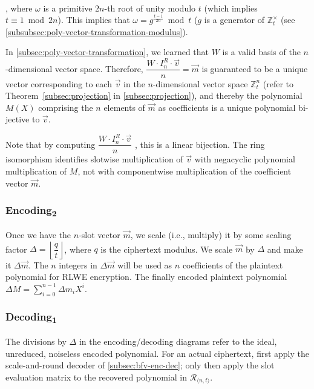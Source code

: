 $ $

, where $\omega$ is a primitive $2n$-th root of unity modulo $t$ (which implies $t \equiv 1 \bmod 2n$). This implies that $\omega = g^{\frac{t - 1}{2n}} \bmod t$ ($g$ is a generator of $\mathbb{Z}_t^{\times}$ (see \autoref{subsubsec:poly-vector-transformation-modulus}).

In \autoref{subsec:poly-vector-transformation}, we learned that $W$ is a valid basis of the $n$-dimensional vector space. Therefore, $\dfrac{W \cdot I_n^R\cdot\vec{v}}{n} = \vec{m}$ is guaranteed to be a unique vector corresponding to each $\vec{v}$ in the $n$-dimensional vector space $\mathbb{Z}_t^{n}$ (refer to Theorem~\ref*{subsec:projection} in \autoref{subsec:projection}), and thereby the polynomial $M(X)$ comprising the $n$ elements of $\vec{m}$ as coefficients is a unique polynomial bi-jective to $\vec{v}$.

Note that by computing $\dfrac{W \cdot I_n^R \cdot \vec{v}}{n}$
, this is a linear bijection. The ring isomorphism identifies slotwise multiplication of $\vec v$ with negacyclic polynomial multiplication of $M$, not with componentwise multiplication of the coefficient vector $\vec m$.

\subsubsection{\textsf{Encoding\textsubscript{2}}}  

Once we have the $n$-slot vector $\vec{m}$, we scale (i.e., multiply) it by some scaling factor $\Delta = \left\lfloor \dfrac{q}{t} \right\rfloor$, where $q$ is the ciphertext modulus. We scale $\vec{m}$ by $\Delta$ and make it $\Delta \vec{m}$. 
The $n$ integers in $\Delta\vec{m}$ will be used as $n$ coefficients of the plaintext polynomial for RLWE encryption. The finally encoded plaintext polynomial $\Delta M = \sum\limits_{i=0}^{n-1}\Delta m_iX^i$. 


\subsubsection{\textsf{Decoding\textsubscript{1}}}  
\label{subsubsec:bfv-enc-dec-decoding1} 

The divisions by $\Delta$ in the encoding/decoding diagrams refer to the ideal, unreduced, noiseless encoded polynomial. For an actual ciphertext, first apply the scale-and-round decoder of \autoref{subsec:bfv-enc-dec}; only then apply the slot evaluation matrix to the recovered polynomial in $\mathcal R_{\langle n,t\rangle}$.

